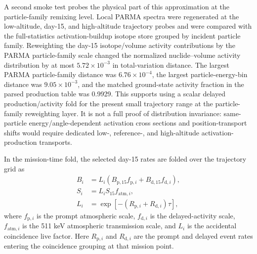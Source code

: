 \documentclass[preprint,12pt]{elsarticle}
\begin{document}
A second smoke test probes the physical part of this approximation at the
particle-family remixing level. Local PARMA spectra were regenerated at the
low-altitude, day-15, and high-altitude trajectory probes and were compared
with the full-statistics activation-buildup isotope store grouped by incident
particle family. Reweighting the day-15 isotope/volume activity contributions
by the PARMA particle-family scale changed the normalized nuclide--volume
activity distribution by at most $5.72\times10^{-3}$ in total-variation
distance. The largest PARMA particle-family distance was
$6.76\times10^{-4}$, the largest particle-energy-bin distance was
$9.05\times10^{-3}$, and the matched ground-state activity fraction in the
parsed production table was 0.9929. This supports using a scalar delayed
production/activity fold for the present small trajectory range at the
particle-family reweighting layer. It is not a full proof of distribution
invariance: same-particle energy/angle-dependent activation cross sections and
position-transport shifts would require dedicated low-, reference-, and
high-altitude activation-production transports.

In the mission-time fold, the selected day-15 rates are folded over the
trajectory grid as
\begin{align}
  B_i &= L_i\left(B_{\mathrm{p},15} f_{\mathrm{p},i}
        + B_{\mathrm{d},15} f_{\mathrm{d},i}\right),\\
  S_i &= L_i S_{15} f_{\mathrm{atm},i},\\
  L_i &= \exp[-(R_{\mathrm{p},i}+R_{\mathrm{d},i})\tau],
\end{align}
where $f_{\mathrm{p},i}$ is the prompt atmospheric scale,
$f_{\mathrm{d},i}$ is the delayed-activity scale, $f_{\mathrm{atm},i}$ is the
511 keV atmospheric transmission scale, and $L_i$ is the accidental
coincidence live factor. Here $R_{\mathrm{p},i}$ and $R_{\mathrm{d},i}$ are the
prompt and delayed event rates entering the coincidence grouping at that
mission point.
\end{document}
